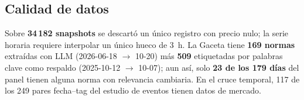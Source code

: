 

\subsection{Calidad de datos}

Sobre \textbf{34\,182 snapshots} se descartó un único registro con precio nulo;
la serie horaria requiere interpolar un único hueco de 3~h. La Gaceta tiene
\textbf{169 normas} extraídas con LLM (2026-06-18 $\rightarrow$ 10-20) más
\textbf{509} etiquetadas por palabras clave como respaldo (2025-10-12
$\rightarrow$ 10-07); aun así, solo \textbf{23 de los 179 días} del panel
tienen alguna norma con relevancia cambiaria. En el cruce temporal, 117 de los
249 pares fecha--tag del estudio de eventos tienen datos de mercado.
